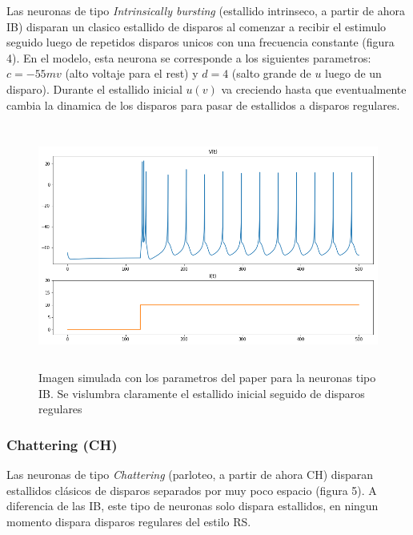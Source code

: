 \documentclass[12pt]{article}
\begin{document}
Las neuronas de tipo \textit{Intrinsically bursting} (estallido intrinseco, a partir de ahora IB)
disparan un clasico estallido de disparos al comenzar a recibir el estimulo seguido luego de repetidos disparos unicos con una frecuencia constante (figura 4).
En el modelo, esta neurona se corresponde a los siguientes parametros: $c = -55 mv$ (alto voltaje para el rest) y $d = 4$ (salto grande de $u$ luego de un disparo).
Durante el estallido inicial $u(v)$ va creciendo hasta que eventualmente cambia la dinamica de los disparos para pasar de estallidos a disparos regulares. \\


\begin{figure}[h!]
    \centering
        \includegraphics[height=8cm]{images/IB.png}
    \caption[fontsize=2pt]{Imagen simulada con los parametros del paper para la neuronas tipo IB. Se vislumbra claramente el estallido inicial seguido de disparos regulares}
\end{figure}
\newpage

 \subsubsection{Chattering (CH)}

 Las neuronas de tipo \textit{Chattering} (parloteo, a partir de ahora CH) disparan estallidos clásicos de disparos separados por muy poco espacio (figura 5). A diferencia de las IB, este tipo de neuronas solo dispara estallidos, en ningun momento dispara disparos regulares del estilo RS.
\end{document}

